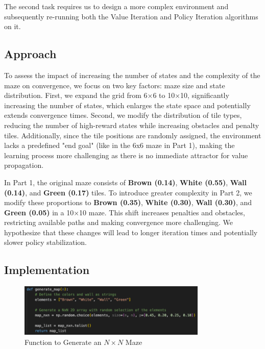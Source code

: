 The second task requires us to design a more complex environment and subsequently re-running both the Value Iteration and Policy Iteration algorithms on it. 

\subsection{Approach}
To assess the impact of increasing the number of states and the complexity of the maze on convergence, we focus on two key factors: maze size and state distribution. First, we expand the grid from 6×6 to 10×10, significantly increasing the number of states, which enlarges the state space and potentially extends convergence times. Second, we modify the distribution of tile types, reducing the number of high-reward states while increasing obstacles and penalty tiles. Additionally, since the tile positions are randomly assigned, the environment lacks a predefined "end goal" (like in the 6x6 maze in Part 1), making the learning process more challenging as there is no immediate attractor for value propagation. \vspace{10pt}

\noindent In Part 1, the original maze consists of \textbf{Brown (0.14)}, \textbf{White (0.55)}, \textbf{Wall (0.14)}, and \textbf{Green (0.17)} tiles. To introduce greater complexity in Part 2, we modify these proportions to \textbf{Brown (0.35)}, \textbf{White (0.30)}, \textbf{Wall (0.30)}, and \textbf{Green (0.05)} in a 10×10 maze. This shift increases penalties and obstacles, restricting available paths and making convergence more challenging. We hypothesize that these changes will lead to longer iteration times and potentially slower policy stabilization.

\subsection{Implementation}
\begin{figure}[H]
    \centering
    \includegraphics[width=0.8\textwidth]{images/generate.png}
    \caption{Function to Generate an \(N \times N\) Maze}
    \label{fig:10x10_maze_function}
\end{figure}

